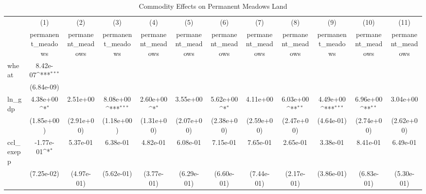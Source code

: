 \begin{table}[htbp]\centering
\def\sym#1{\ifmmode^{#1}\else\(^{#1}\)\fi}
\caption{Commodity Effects on Permanent Meadows Land}
\begin{tabular}{l*{11}{c}}
\hline\hline
            &\multicolumn{1}{c}{(1)}&\multicolumn{1}{c}{(2)}&\multicolumn{1}{c}{(3)}&\multicolumn{1}{c}{(4)}&\multicolumn{1}{c}{(5)}&\multicolumn{1}{c}{(6)}&\multicolumn{1}{c}{(7)}&\multicolumn{1}{c}{(8)}&\multicolumn{1}{c}{(9)}&\multicolumn{1}{c}{(10)}&\multicolumn{1}{c}{(11)}\\
            &\multicolumn{1}{c}{permanent\_meadows}&\multicolumn{1}{c}{permanent\_meadows}&\multicolumn{1}{c}{permanent\_meadows}&\multicolumn{1}{c}{permanent\_meadows}&\multicolumn{1}{c}{permanent\_meadows}&\multicolumn{1}{c}{permanent\_meadows}&\multicolumn{1}{c}{permanent\_meadows}&\multicolumn{1}{c}{permanent\_meadows}&\multicolumn{1}{c}{permanent\_meadows}&\multicolumn{1}{c}{permanent\_meadows}&\multicolumn{1}{c}{permanent\_meadows}\\
\hline
wheat       &    8.42e-07\sym{***}&                     &                     &                     &                     &                     &                     &                     &                     &                     &                     \\
            &  (6.84e-09)         &                     &                     &                     &                     &                     &                     &                     &                     &                     &                     \\
[1em]
ln\_gdp      &    4.38e+00\sym{*}  &    2.51e+00         &    8.08e+00\sym{***}&    2.60e+00\sym{*}  &    3.55e+00         &    5.62e+00\sym{*}  &    4.11e+00         &    6.03e+00\sym{**} &    4.49e+00\sym{***}&    6.96e+00\sym{**} &    3.04e+00         \\
            &  (1.85e+00)         &  (2.91e+00)         &  (1.18e+00)         &  (1.31e+00)         &  (2.07e+00)         &  (2.38e+00)         &  (2.59e+00)         &  (2.47e+00)         &  (4.64e-01)         &  (2.74e+00)         &  (2.62e+00)         \\
[1em]
ccl\_exepp   &   -1.77e-01\sym{*}  &    5.37e-01         &    6.38e-01         &    4.82e-01         &    6.08e-01         &    7.15e-01         &    7.65e-01         &    2.65e-01         &    3.38e-01         &    8.41e-01         &    6.49e-01         \\
            &  (7.25e-02)         &  (4.97e-01)         &  (5.62e-01)         &  (3.77e-01)         &  (6.29e-01)         &  (6.60e-01)         &  (7.44e-01)         &  (2.17e-01)         &  (3.86e-01)         &  (6.83e-01)         &  (5.30e-01)         \\

\end{tabular}
\end{table}
